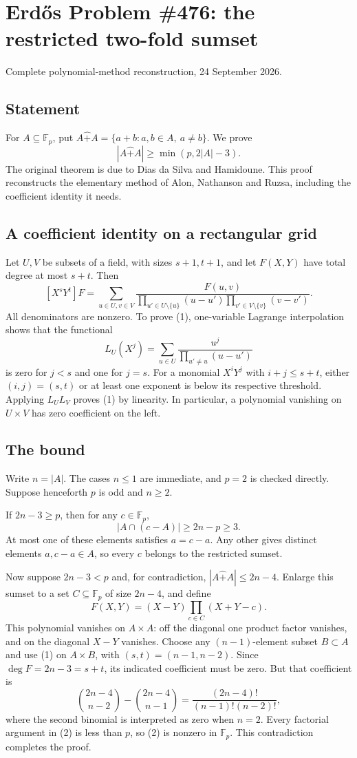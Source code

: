 \section{Erd\H{o}s Problem \#476: the restricted two-fold sumset}
\noindent Complete polynomial-method reconstruction, 24 September 2026.

\subsection*{Statement}
For $A\subseteq\mathbb F_p$, put $A\hat+ A=\{a+b:a,b\in A,\ a\ne b\}$. We prove
\[|A\hat+ A|\ge\min(p,2|A|-3).\]
The original theorem is due to Dias da Silva and Hamidoune. This proof reconstructs the elementary method of Alon, Nathanson and Ruzsa, including the coefficient identity it needs.

\subsection*{A coefficient identity on a rectangular grid}
Let $U,V$ be subsets of a field, with sizes $s+1,t+1$, and let $F(X,Y)$ have total degree at most $s+t$. Then
\[[X^sY^t]F=\sum_{u\in U,v\in V}\frac{F(u,v)}{\prod_{u'\in U\setminus\{u\}}(u-u')\prod_{v'\in V\setminus\{v\}}(v-v')}.\tag{1}\]
All denominators are nonzero. To prove (1), one-variable Lagrange interpolation shows that the functional
\[L_U(X^j)=\sum_{u\in U}\frac{u^j}{\prod_{u'\ne u}(u-u')}\]
is zero for $j<s$ and one for $j=s$. For a monomial $X^iY^j$ with $i+j\le s+t$, either $(i,j)=(s,t)$ or at least one exponent is below its respective threshold. Applying $L_U L_V$ proves (1) by linearity. In particular, a polynomial vanishing on $U\times V$ has zero coefficient on the left.

\subsection*{The bound}
Write $n=|A|$. The cases $n\le1$ are immediate, and $p=2$ is checked directly. Suppose henceforth $p$ is odd and $n\ge2$.

If $2n-3\ge p$, then for any $c\in\mathbb F_p$,
\[|A\cap(c-A)|\ge2n-p\ge3.\]
At most one of these elements satisfies $a=c-a$. Any other gives distinct elements $a,c-a\in A$, so every $c$ belongs to the restricted sumset.

Now suppose $2n-3<p$ and, for contradiction, $|A\hat+ A|\le2n-4$. Enlarge this sumset to a set $C\subseteq\mathbb F_p$ of size $2n-4$, and define
\[F(X,Y)=(X-Y)\prod_{c\in C}(X+Y-c).\]
This polynomial vanishes on $A\times A$: off the diagonal one product factor vanishes, and on the diagonal $X-Y$ vanishes. Choose any $(n-1)$-element subset $B\subset A$ and use (1) on $A\times B$, with $(s,t)=(n-1,n-2)$. Since $\deg F=2n-3=s+t$, its indicated coefficient must be zero. But that coefficient is
\[\binom{2n-4}{n-2}-\binom{2n-4}{n-1}
=\frac{(2n-4)!}{(n-1)!(n-2)!},\tag{2}\]
where the second binomial is interpreted as zero when $n=2$. Every factorial argument in (2) is less than $p$, so (2) is nonzero in $\mathbb F_p$. This contradiction completes the proof.

